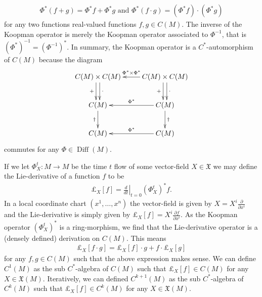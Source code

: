 \documentclass[12pt]{amsart}
\newcommand{\pder}[2]{\ensuremath{\frac{ \partial #1}{\partial #2}}}
\DeclareMathOperator{\Diff}{Diff}
\begin{document}
\begin{align*}
	\Phi^*(f+g) = \Phi^*f + \Phi^*g \text{ and } \Phi^*(f\cdot g) = (\Phi^*f) \cdot (\Phi^*g)
\end{align*}
for any two functions real-valued functions $f,g \in C(M)$.
The inverse of the Koopman operator is merely the Koopman operator associated to $\Phi^{-1}$, that is $(\Phi^*)^{-1} = (\Phi^{-1})^*$.
In summary, the Koopman operator is a $C^*$-automorphism of $C(M)$
because the diagram
\begin{equation}
	\xymatrix{
		C(M) \times C(M)  \ar@<-0.6ex>[d]_{+} \ar@<0.6ex>[d]^{\cdot} & \ar[l]_{\Phi^* \times \Phi^*} C(M) \times C(M)  \ar@<-0.6ex>[d]_{+} \ar@<0.6ex>[d]^{\cdot} \\
		C(M) \ar[d]_{\dagger} & \ar[l]_{\Phi^*} C(M) \ar[d]^{\dagger} \\
		C(M) & \ar[l]_{\Phi^*} C(M)
	}
\end{equation}
commutes for any $\Phi \in \Diff(M)$.

If we let $\Phi^t_X: M \to M$ be the time $t $ flow of some vector-field $X \in \mathfrak{X}$
we may define the Lie-derivative of a function $f$ to be
\begin{align*}
	\pounds_X[f] = \left. \frac{d}{d t} \right|_{t=0} (\Phi_X^t)^*f.
\end{align*}
In a local coordinate chart $(x^1,\dots,x^n)$ the vector-field is given by $X = X^i \pder{}{x^i}$
and the Lie-derivative is simply given by $\pounds_{X}[f] = X^i \pder{f}{x^i}$.
As the Koopman operator $(\Phi_X^t)^*$ is a ring-morphism, we find that the Lie-derivative operator is a (densely defined) derivation on $C(M)$.
This means
\begin{align*}
	\pounds_X[ f \cdot g] = \pounds_X[f] \cdot g + f \cdot \pounds_X[g]
\end{align*}
for any $f,g \in C(M)$ such that the above expression makes sense.
We can define $C^1(M)$ as the sub $C^*$-algebra of $C(M)$ such that $\pounds_X[f] \in C(M)$ for any $X \in \mathfrak{X}(M)$.
Iteratively, we can defined $C^{k+1}(M)$ as the sub $C^*$-algebra of $C^{k}(M)$ such that $\pounds_X[f] \in C^k(M)$ for any $X \in \mathfrak{X}(M)$.
\end{document}
